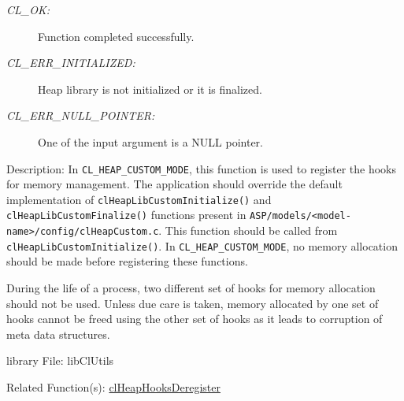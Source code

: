 \begin{flushleft}
\begin{Desc}
\begin{description}
\item[{\em CL\_\-OK:}] Function completed successfully.
\item[{\em CL\_\-ERR\_\-INITIALIZED:}] Heap library is not initialized or it is finalized.
\item[{\em CL\_\-ERR\_\-NULL\_\-POINTER:}] One of the input argument is a NULL pointer.
\end{description}
\end{Desc}
\begin{Desc}
\item[Description:] In {\tt{CL\_\-HEAP\_\-CUSTOM\_\-MODE}}, this function is used to register the hooks for memory
management. The application should override the default
implementation of {\tt{clHeapLibCustomInitialize()}} and
{\tt{clHeapLibCustomFinalize()}} functions present in
{\tt{ASP/models/<model-name>/config/clHeapCustom.c}}. This
function should be called from {\tt{clHeapLibCustomInitialize()}}. In
{\tt{CL\_\-HEAP\_\-CUSTOM\_\-MODE}}, no memory allocation should be made before registering these functions.
\par
During the life of a process, two different set of hooks for memory
allocation should not be used. Unless due care is taken, memory
allocated by one set of hooks cannot be freed using the other set
of hooks as it leads to corruption of meta data structures.

\end{Desc}
\begin{Desc}
\item[library File:]lib\-Cl\-Utils\end{Desc}
\begin{Desc}
\item[Related Function(s):]\hyperlink{pageheap113}{clHeapHooksDeregister}\end{Desc}
\newpage






\end{flushleft}
